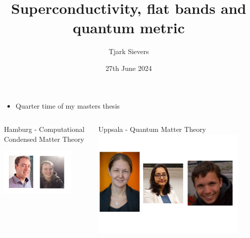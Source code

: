 \documentclass[aspectratio=169]{beamer}
\title{Superconductivity, flat bands and quantum metric}
\author{Tjark Sievers}
\date{27th June 2024}
\institute[I. ITP - Computational Condensed Matter Theory]{I. Institute of Theoretical Physics}
\begin{document}
	

{
\begin{frame}
	\titlepage
\end{frame}
}
\addtocounter{framenumber}{-1}

\begin{frame}
	\begin{itemize}
		\item Quarter time of my masters thesis
	\end{itemize}
	
	\begin{columns}[T]
		\begin{column}{0.5\textwidth}
			\begin{center}
				Hamburg - Computational Condensed Matter Theory
				
				\includegraphics[width=0.8\textwidth]{figs/People Tim.png}
			\end{center}	
		\end{column}
		\begin{column}{0.5\textwidth}
			\begin{center}
				Uppsala - Quantum Matter Theory
				\includegraphics[width=0.9\textwidth]{figs/People Annica.png}
			\end{center}
		\end{column}
	\end{columns}
\end{frame}
\end{document}
